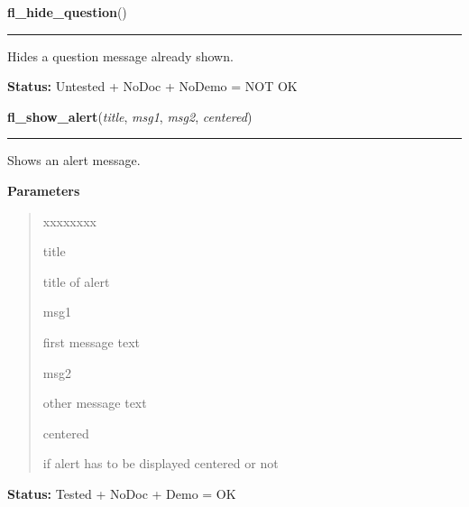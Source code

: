 \hspace{.8\funcindent}\begin{boxedminipage}{\funcwidth}

    \raggedright \textbf{fl\_hide\_question}()

    \vspace{-1.5ex}

    \rule{\textwidth}{0.5\fboxrule}
\setlength{\parskip}{2ex}
    Hides a question message already shown.

\setlength{\parskip}{1ex}
\textbf{Status:} Untested + NoDoc + NoDemo = NOT OK



    \end{boxedminipage}

    \label{xformslib:library:fl_show_alert}

    \vspace{0.5ex}

\hspace{.8\funcindent}\begin{boxedminipage}{\funcwidth}

    \raggedright \textbf{fl\_show\_alert}(\textit{title}, \textit{msg1}, \textit{msg2}, \textit{centered})

    \vspace{-1.5ex}

    \rule{\textwidth}{0.5\fboxrule}
\setlength{\parskip}{2ex}
    Shows an alert message.

\setlength{\parskip}{1ex}
      \textbf{Parameters}
      \vspace{-1ex}

      \begin{quote}
        \begin{Ventry}{xxxxxxxx}

          \item[title]

          title of alert

          \item[msg1]

          first message text

          \item[msg2]

          other message text

          \item[centered]

          if alert has to be displayed centered or not

        \end{Ventry}

      \end{quote}

\textbf{Status:} Tested + NoDoc + Demo = OK



    \end{boxedminipage}

